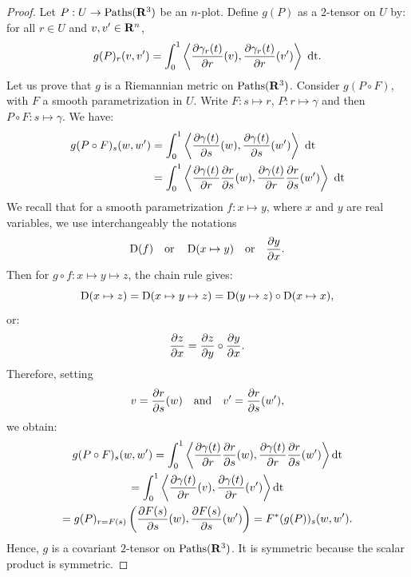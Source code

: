 \begin{proof}
  Let $P: U \to \operatorname{Paths}(\mathbf{R}^3)$ be an $n$-plot.
  Define $g(P)$ as a $2$-tensor on $U$ by:
  for all $r \in U$ and $v,v' \in \mathbf{R}^n$,
  $$
    g(P)_r(v,v') = \int_0^1 \left\langle {\partial \gamma_r(t) \over \partial r}(v), {\partial \gamma_r(t) \over \partial r}(v') \right\rangle \ \mathrm{dt}.
    $$
  Let us prove that $g$ is a Riemannian metric on $\operatorname{Paths}(\mathbf{R}^3)$.
  Consider $g(P \circ F)$,
  with $F$ a smooth parametrization in $U$.
  Write $F :s \mapsto r$,
  $P : r \mapsto \gamma$ and then $P \circ F : s \mapsto \gamma$.
  We have:
  \begin{align*}
    g(P \circ F)_s(w,w') &  = \int_0^1 \left\langle {\partial \gamma(t) \over \partial s}(w), {\partial \gamma(t) \over \partial s}(w') \right\rangle \ \mathrm{dt} \\
    & = \int_0^1 \left\langle {\partial \gamma(t) \over \partial r}{\partial r \over \partial s}(w), {\partial \gamma(t) \over \partial r}{\partial r \over \partial s}(w')  \right\rangle \ \mathrm{dt} \\
  \end{align*}
  We recall that for a smooth parametrization $f : x \mapsto y$,
  where $x$ and $y$ are real variables,
  we use interchangeably the notations
  $$
    \operatorname{D}(f) \quad \text{or} \quad \operatorname{D}(x \mapsto y) \quad \text{or} \quad {\partial y \over \partial x}.
    $$
  Then for $g \circ f : x \mapsto y \mapsto z$,
  the chain rule gives:
  $$
    \operatorname{D}(x \mapsto z) = \operatorname{D}(x \mapsto y \mapsto z) = \operatorname{D}(y \mapsto z) \circ \operatorname{D}(x \mapsto x),
    $$
  or:
  $$
    {\partial z \over \partial x} = {\partial z \over \partial y} \circ  {\partial y \over \partial x}.
    $$
  Therefore,
  setting
  $$
    v = {\partial r \over \partial s}(w) \quad \text{and} \quad v' = {\partial r \over \partial s}(w'),
    $$
  we obtain:
  \begin{multline*}
    g(P \circ F)_s(w,w')   = \int_0^1 \left\langle {\partial \gamma(t) \over \partial r}{\partial r \over \partial s}(w), {\partial \gamma(t) \over \partial r}{\partial r \over \partial s}(w')  \right\rangle \mathrm{dt} \\
    = \int_0^1 \left\langle {\partial \gamma(t) \over \partial r}(v), {\partial \gamma(t) \over \partial r}(v') \right\rangle \mathrm{dt} \\
    = g(P)_{r = F(s)} \left({\partial F(s) \over \partial s}(w), {\partial F(s) \over \partial s}(w')\right)
    = F^*(g(P))_s(w,w').
  \end{multline*}
  Hence,
  $g$ is a covariant $2$-tensor on $\operatorname{Paths}(\mathbf{R}^3)$.
  It is symmetric because the scalar product is symmetric.
  

\end{proof}
